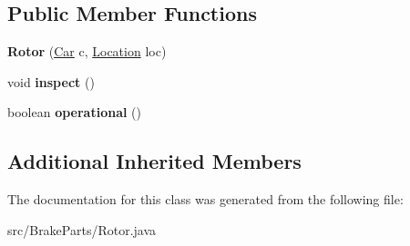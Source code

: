 \subsection*{Public Member Functions}
\begin{DoxyCompactItemize}
\item 
\hypertarget{classBrakeParts_1_1Rotor_aa8072fe1733e9333d81109955b3bb25b}{}{\bfseries Rotor} (\hyperlink{classCars_1_1Car}{Car} c, \hyperlink{enumEnums_1_1Location}{Location} loc)\label{classBrakeParts_1_1Rotor_aa8072fe1733e9333d81109955b3bb25b}

\item 
\hypertarget{classBrakeParts_1_1Rotor_a449851eee6c2ead95bd0c2c846ce087a}{}void {\bfseries inspect} ()\label{classBrakeParts_1_1Rotor_a449851eee6c2ead95bd0c2c846ce087a}

\item 
\hypertarget{classBrakeParts_1_1Rotor_af41feb8b05d175429aa0af9bc4f737f2}{}boolean {\bfseries operational} ()\label{classBrakeParts_1_1Rotor_af41feb8b05d175429aa0af9bc4f737f2}

\end{DoxyCompactItemize}
\subsection*{Additional Inherited Members}


The documentation for this class was generated from the following file\+:\begin{DoxyCompactItemize}
\item 
src/\+Brake\+Parts/Rotor.\+java\end{DoxyCompactItemize}
